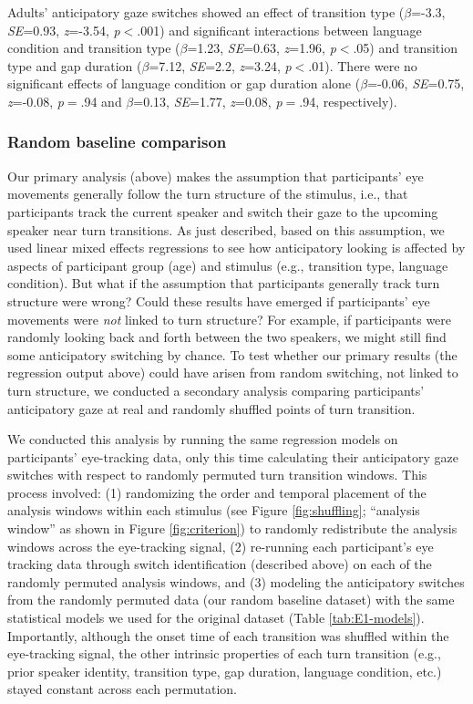 \documentclass[authoryear, 12pt]{elsarticle}
\begin{document}
Adults' anticipatory gaze switches showed an effect of transition type (\textit{$\beta$}=-3.3, \textit{SE}=0.93, \textit{z}=-3.54, \textit{p}$<$.001) and significant interactions between language condition and transition type (\textit{$\beta$}=1.23, \textit{SE}=0.63, \textit{z}=1.96, \textit{p}$<$.05) and transition type and gap duration (\textit{$\beta$}=7.12, \textit{SE}=2.2, \textit{z}=3.24, \textit{p}$<$.01). There were no significant effects of language condition or gap duration alone (\textit{$\beta$}=-0.06, \textit{SE}=0.75, \textit{z}=-0.08, \textit{p}$=$.94 and \textit{$\beta$}=0.13, \textit{SE}=1.77, \textit{z}=0.08, \textit{p}$=$.94, respectively).


\subsubsection*{Random baseline comparison}
\label{sec:randbaseline1}

Our primary analysis (above) makes the assumption that participants' eye movements generally follow the turn structure of the stimulus, i.e., that participants track the current speaker and switch their gaze to the upcoming speaker near turn transitions. As just described, based on this assumption, we used linear mixed effects regressions to see how anticipatory looking is affected by aspects of participant group (age) and stimulus (e.g., transition type, language condition). But what if the assumption that participants generally track turn structure were wrong? Could these results have emerged if participants' eye movements were \textit{not} linked to turn structure? For example, if participants were randomly looking back and forth between the two speakers, we might still find some anticipatory switching by chance. To test whether our primary results (the regression output above) could have arisen from random switching, not linked to turn structure, we conducted a secondary analysis comparing participants' anticipatory gaze at real and randomly shuffled points of turn transition.

We conducted this analysis by running the same regression models on participants' eye-tracking data, only this time calculating their anticipatory gaze switches with respect to randomly permuted turn transition windows. This process involved: (1) randomizing the order and temporal placement of the analysis windows within each stimulus (see Figure \ref{fig:shuffling}; ``analysis window'' as shown in Figure \ref{fig:criterion}) to randomly redistribute the analysis windows across the eye-tracking signal, (2) re-running each participant's eye tracking data through switch identification (described above) on each of the randomly permuted analysis windows, and (3) modeling the anticipatory switches from the randomly permuted data (our random baseline dataset) with the same statistical models we used for the original dataset (Table \ref{tab:E1-models}). Importantly, although the onset time of each transition was shuffled within the eye-tracking signal, the other intrinsic properties of each turn transition (e.g., prior speaker identity, transition type, gap duration, language condition, etc.) stayed constant across each permutation. 
\end{document}
